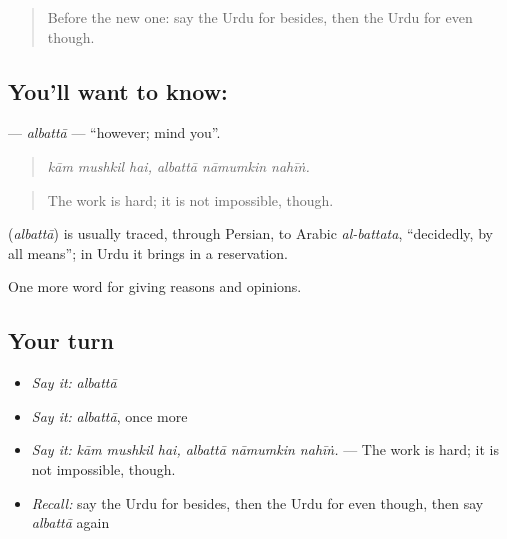 \label{lesson:UR-C359-albatta}



\begin{quote}
Before the new one: say the Urdu for besides, then the Urdu for even though.
\end{quote}

\subsection*{You'll want to know: }
\textbf{} — \emph{albattā} — \textquotedblleft{}however; mind you\textquotedblright{}.

\begin{quote}
     
\end{quote}

\begin{quote}
\emph{kām mushkil hai, albattā nāmumkin nahīṅ.}
\end{quote}

\begin{quote}
The work is hard; it is not impossible, though.
\end{quote}

\begin{cousinweb}
\textbf{} (\emph{albattā}) is usually traced, through Persian, to Arabic \emph{al-battata}, \textquotedblleft{}decidedly, by all means\textquotedblright{}; in Urdu it brings in a reservation.
\end{cousinweb}

\begin{grammarlens}[title={What you've built}]
One more word for giving reasons and opinions.
\end{grammarlens}

\subsection*{Your turn}
\begin{itemize}
\raggedright
  \item \emph{Say it:} \emph{albattā}
  \item \emph{Say it:} \emph{albattā}, once more
  \item \emph{Say it:} \emph{kām mushkil hai, albattā nāmumkin nahīṅ.} — The work is hard; it is not impossible, though.
  \item \emph{Recall:} say the Urdu for besides, then the Urdu for even though, then say \emph{albattā} again
\end{itemize}

